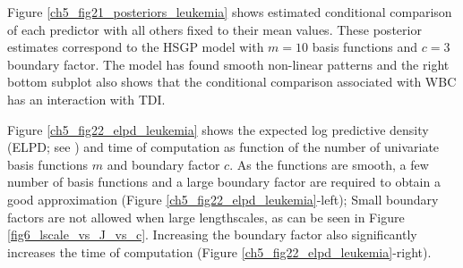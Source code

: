 \documentclass[onecolumn,a4paper,11pt]{article}
\begin{document}
Figure \ref{ch5_fig21_posteriors_leukemia} shows estimated conditional comparison of each predictor with all others fixed to their mean values. These posterior estimates correspond to the HSGP model with $m=10$ basis functions and $c=3$ boundary factor. The model has found smooth non-linear patterns and the right bottom subplot also shows that the conditional comparison associated with WBC has an interaction with TDI.


Figure \ref{ch5_fig22_elpd_leukemia} shows the expected log predictive density (ELPD; see \cite{vehtari_2012}) and time of computation as function of the number of univariate basis functions $m$ and boundary factor $c$. As the functions are smooth, a few number of basis functions and a large boundary factor are required to obtain a good approximation (Figure \ref{ch5_fig22_elpd_leukemia}-left); Small boundary factors are not allowed when large lengthscales, as can be seen in Figure \ref{fig6_lscale_vs_J_vs_c}. Increasing the boundary factor also significantly increases the time of computation (Figure \ref{ch5_fig22_elpd_leukemia}-right).
%
\end{document}
